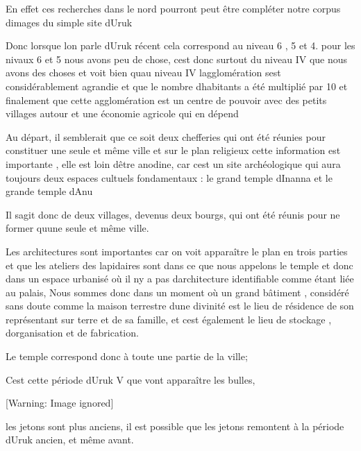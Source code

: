 \documentclass{article}
\begin{document}
En effet ces recherches dans le nord pourront peut être compléter notre
corpus d{\textquotesingle}images du simple site d{\textquotesingle}Uruk

Donc lorsque l{\textquotesingle}on parle d{\textquotesingle}Uruk récent
cela correspond au niveau 6 , 5 et 4. pour les nivaux 6 et 5 nous avons
peu de chose, c{\textquotesingle}est donc surtout du niveau IV que nous
avons des choses et voit bien qu{\textquotesingle}au niveau IV
l{\textquotesingle}agglomération s{\textquotesingle}est
considérablement agrandie et que le nombre d{\textquotesingle}habitants
a été multiplié par 10 et finalement que cette agglomération est un
centre de pouvoir avec des petits villages autour et une économie
agricole qui en dépend

Au départ, il semblerait que ce soit deux chefferies qui ont été réunies
pour constituer une seule et même ville et sur le plan religieux cette
information est importante , elle est loin d{\textquotesingle}être
anodine, car c{\textquotesingle}est un site archéologique qui aura
toujours deux espaces cultuels fondamentaux : le grand temple
d{\textquotesingle}Inanna  et le grande temple d{\textquotesingle}Anu

Il s{\textquotesingle}agit donc de deux villages, devenus deux bourgs,
qui ont été réunis pour ne former qu{\textquotesingle}une seule et même
ville.

Les architectures sont importantes car on voit apparaître le plan en
trois parties et que les ateliers des lapidaires sont dans ce que nous
appelons le temple et donc dans un espace urbanisé où il
n{\textquotesingle}y a pas d{\textquotesingle}architecture 
identifiable comme étant liée au palais,  Nous sommes donc dans un
moment où un grand bâtiment , considéré sans doute comme la maison
terrestre d{\textquotesingle}une divinité est le lieu de résidence de
son représentant sur terre et de sa famille, et c{\textquotesingle}est
également le lieu de stockage , d{\textquotesingle}organisation et de
fabrication.

Le temple correspond donc à toute une partie de la ville;

C{\textquotesingle}est  cette période d{\textquotesingle}Uruk V que vont
apparaître les bulles, 

  [Warning: Image ignored] %
 

les jetons sont plus anciens, il est possible que les jetons remontent à
la période d{\textquotesingle}Uruk ancien, et même avant.
\end{document}
